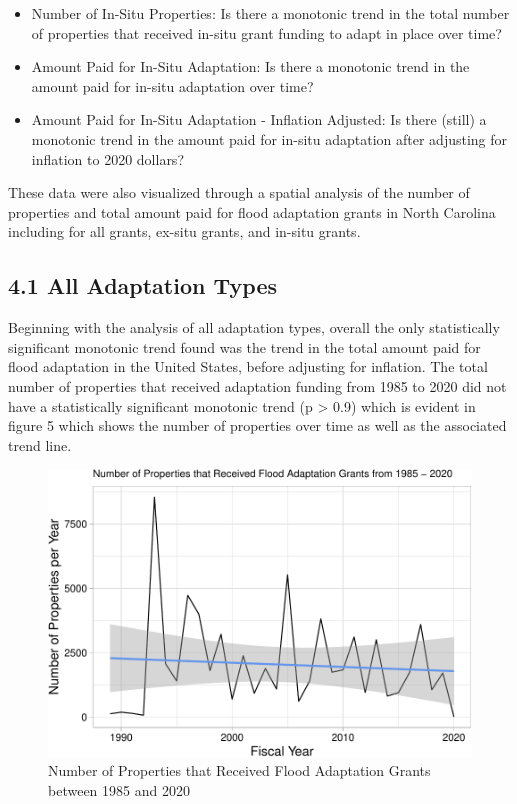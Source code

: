 \documentclass[
  12pt,
]{article}
\begin{document}
\begin{itemize}
\item
  Number of In-Situ Properties: Is there a monotonic trend in the total
  number of properties that received in-situ grant funding to adapt in
  place over time?
\item
  Amount Paid for In-Situ Adaptation: Is there a monotonic trend in the
  amount paid for in-situ adaptation over time?
\item
  Amount Paid for In-Situ Adaptation - Inflation Adjusted: Is there
  (still) a monotonic trend in the amount paid for in-situ adaptation
  after adjusting for inflation to 2020 dollars?
\end{itemize}

These data were also visualized through a spatial analysis of the number
of properties and total amount paid for flood adaptation grants in North
Carolina including for all grants, ex-situ grants, and in-situ grants.

\hypertarget{all-adaptation-types}{%
\subsection{4.1 All Adaptation Types}\label{all-adaptation-types}}

Beginning with the analysis of all adaptation types, overall the only
statistically significant monotonic trend found was the trend in the
total amount paid for flood adaptation in the United States, before
adjusting for inflation. The total number of properties that received
adaptation funding from 1985 to 2020 did not have a statistically
significant monotonic trend (p \textgreater{} 0.9) which is evident in
figure 5 which shows the number of properties over time as well as the
associated trend line.

\begin{figure}
\centering
\includegraphics{finalreport_files/figure-latex/unnamed-chunk-9-1.pdf}
\caption{Number of Properties that Received Flood Adaptation Grants
between 1985 and 2020}
\end{figure}
\end{document}
